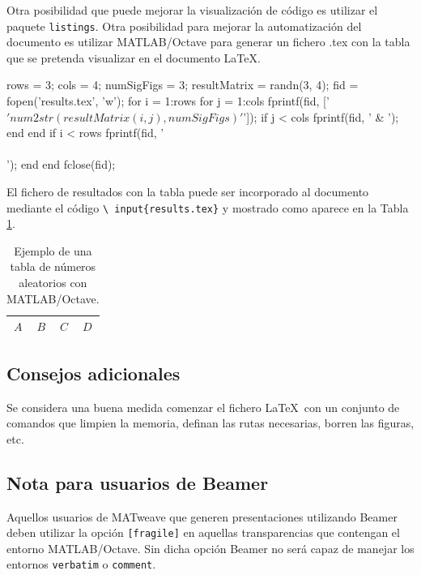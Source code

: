 \documentclass{article}
\newenvironment{matlabv}{\verbatim}{\endverbatim}
\begin{document}
Otra posibilidad que puede mejorar la visualización de código es utilizar el paquete \texttt{listings}. Otra posibilidad para mejorar la automatización del documento es utilizar MATLAB/Octave para generar un fichero .tex con la tabla que se pretenda visualizar en el documento \LaTeX.

\begin{matlabv}
rows = 3;
cols = 4;
numSigFigs = 3;
resultMatrix = randn(3, 4); 
fid = fopen('results.tex', 'w');
for i = 1:rows
  for j = 1:cols
    fprintf(fid, ['$' num2str(resultMatrix(i, j), numSigFigs) '$']);
    if j < cols
      fprintf(fid, ' & ');
    end
  end
  if i < rows
    fprintf(fid, '\\\\\n');
  end 
end
fclose(fid);
\end{matlabv}

El fichero de resultados con la tabla puede ser incorporado al documento mediante el código \texttt{\textbackslash
  input\{results.tex\}} y mostrado como aparece en la Tabla \ref{table:one}.

\begin{table}
\caption{Ejemplo de una tabla de números aleatorios con MATLAB/Octave.}\label{table:one}
\begin{center}
\begin{tabular}{c|c|c|c}
$A$ & $B$ & $C$ & $D$ \\
\hline

\end{tabular}
\end{center}
\end{table}

\subsection{Consejos adicionales}

Se considera una buena medida comenzar el fichero \LaTeX\ con un conjunto de comandos que limpien la memoria, definan las rutas necesarias, borren las figuras, etc.

\subsection{Nota para usuarios de Beamer}

Aquellos usuarios de MATweave que generen presentaciones utilizando Beamer deben utilizar la opción \texttt{[fragile]} 
en aquellas transparencias que contengan el entorno MATLAB/Octave. Sin dicha opción Beamer no será capaz de manejar los entornos \texttt{verbatim} o \texttt{comment}.
\end{document}
